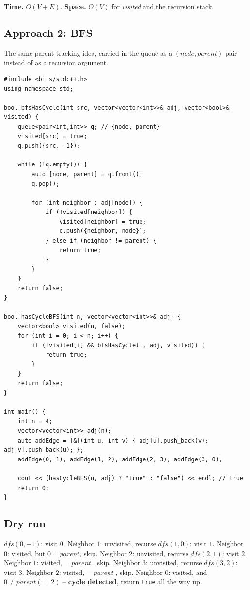 \begin{complexitybox}
\textbf{Time.} $O(V+E)$.
\textbf{Space.} $O(V)$ for \textit{visited} and the recursion stack.
\end{complexitybox}

\subsection*{Approach 2: BFS}

The same parent-tracking idea, carried in the queue as a
$(\textit{node}, \textit{parent})$ pair instead of as a recursion
argument.

\begin{lstlisting}
#include <bits/stdc++.h>
using namespace std;

bool bfsHasCycle(int src, vector<vector<int>>& adj, vector<bool>& visited) {
    queue<pair<int,int>> q; // {node, parent}
    visited[src] = true;
    q.push({src, -1});

    while (!q.empty()) {
        auto [node, parent] = q.front();
        q.pop();

        for (int neighbor : adj[node]) {
            if (!visited[neighbor]) {
                visited[neighbor] = true;
                q.push({neighbor, node});
            } else if (neighbor != parent) {
                return true;
            }
        }
    }
    return false;
}

bool hasCycleBFS(int n, vector<vector<int>>& adj) {
    vector<bool> visited(n, false);
    for (int i = 0; i < n; i++) {
        if (!visited[i] && bfsHasCycle(i, adj, visited)) {
            return true;
        }
    }
    return false;
}

int main() {
    int n = 4;
    vector<vector<int>> adj(n);
    auto addEdge = [&](int u, int v) { adj[u].push_back(v); adj[v].push_back(u); };
    addEdge(0, 1); addEdge(1, 2); addEdge(2, 3); addEdge(3, 0);

    cout << (hasCycleBFS(n, adj) ? "true" : "false") << endl; // true
    return 0;
}
\end{lstlisting}

\subsection*{Dry run}


$\textit{dfs}(0,-1)$: visit $0$. Neighbor $1$: unvisited, recurse
$\textit{dfs}(1,0)$: visit $1$. Neighbor $0$: visited, but
$0=\textit{parent}$, skip. Neighbor $2$: unvisited, recurse
$\textit{dfs}(2,1)$: visit $2$. Neighbor $1$: visited, $=\textit{parent}$,
skip. Neighbor $3$: unvisited, recurse $\textit{dfs}(3,2)$: visit $3$.
Neighbor $2$: visited, $=\textit{parent}$, skip. Neighbor $0$: visited,
and $0 \neq \textit{parent}(=2)$ -- \textbf{cycle detected}, return
\texttt{true} all the way up.

